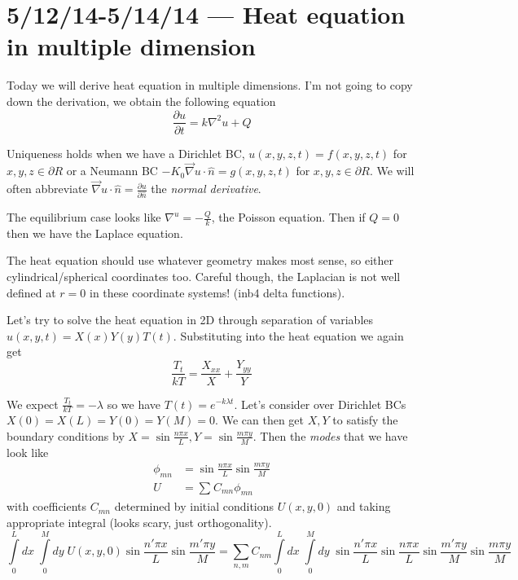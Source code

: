 \documentclass[10pt]{report}
\newcommand{\pd}[2]{\frac{\partial #1}{\partial#2}}
\begin{document}
\chapter{5/12/14-5/14/14 --- Heat equation in multiple dimension}

Today we will derive heat equation in multiple dimensions. I'm not going to copy down the derivation, we obtain the following equation
\begin{equation}
    \pd{u}{t} = k\nabla^2 u + Q
\end{equation}

Uniqueness holds when we have a Dirichlet BC, $u(x,y,z,t) = f(x,y,z,t)$ for $x,y,z \in \partial R$ or a Neumann BC $-K_0 \vec{\nabla} u \cdot \hat{n} = g(x,y,z,t)$ for $x,y,z \in \partial R$. We will often abbreviate $\vec{\nabla} u \cdot \hat{n} = \pd{u}{\hat{n}}$ the \emph{normal derivative}. 

The equilibrium case looks like $\nabla^ u = -\frac{Q}{k}$, the Poisson equation. Then if $Q = 0$ then we have the Laplace equation.

The heat equation should use whatever geometry makes most sense, so either cylindrical/spherical coordinates too. Careful though, the Laplacian is not well defined at $r=0$ in these coordinate systems! (inb4 delta functions).

Let's try to solve the heat equation in 2D through separation of variables $u(x,y,t) = X(x)Y(y)T(t)$. Substituting into the heat equation we again get
\begin{equation}
    \frac{T_t}{kT} = \frac{X_{xx}}{X} + \frac{Y_{yy}}{Y}
\end{equation}

We expect $\frac{T_t}{kT} = -\lambda$ so we have $T(t) = e^{-k\lambda t}$. Let's consider over Dirichlet BCs $X(0) = X(L) = Y(0) = Y(M) =0$. We can then get $X,Y$ to satisfy the boundary conditions by $X = \sin \frac{n\pi x}{L}, Y = \sin \frac{m \pi y}{M}$. Then the \emph{modes} that we have look like
\begin{align}
    \phi_{mn} &= \sin \frac{n\pi x}{L}\sin \frac{m\pi y}{M}\\
    U &= \sum\limits_{}^{}C_{mn}\phi_{mn}
\end{align}
with coefficients $C_{mn}$ determined by initial conditions $U(x,y,0)$ and taking appropriate integral (looks scary, just orthogonality).
\begin{equation}
    \int\limits_{0}^{L}dx\;\int\limits_{0}^{M}dy\;U(x,y,0) \sin \frac{n' \pi x}{L} \sin \frac{m' \pi y}{M} = \sum\limits_{n,m}^{}C_{nm}\int\limits_{0}^{L}dx\;\int\limits_{0}^{M}dy\; \sin \frac{n' \pi x}{L}\sin \frac{n\pi x}{L} \sin \frac{m' \pi y}{M}\sin \frac{m\pi y}{M}
\end{equation}
\end{document}
